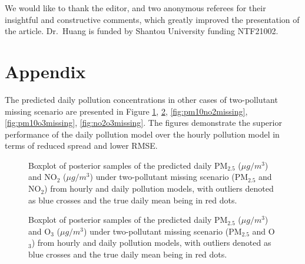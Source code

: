 \documentclass[
  12,
]{article}
\begin{document}
We would like to thank the editor, and two anonymous referees for their
insightful and constructive comments, which greatly improved the
presentation of the article. Dr.~Huang is funded by Shantou University
funding NTF21002.

\hypertarget{appendix}{%
\section*{Appendix}\label{appendix}}

The predicted daily pollution concentrations in other cases of
two-pollutant missing scenario are presented in Figure
\ref{fig:pm25no2missing}, \ref{fig:pm25o3missing},
\ref{fig:pm10no2missing}, \ref{fig:pm10o3missing},
\ref{fig:no2o3missing}. The figures demonstrate the superior performance
of the daily pollution model over the hourly pollution model in terms of
reduced spread and lower RMSE.

\begin{figure}[H]
\caption{Boxplot of posterior samples of the predicted daily PM$_{2.5}$ ($\mu g/m^3$) and NO$_{2}$ ($\mu g/m^3$) under two-pollutant missing scenario (PM$_{2.5}$ and NO$_2$) from hourly and daily pollution models, with outliers denoted as blue crosses and the true daily mean being in red dots.}\label{fig:pm25no2missing}
\end{figure}

\begin{figure}[H]
\caption{Boxplot of posterior samples of the predicted daily PM$_{2.5}$ ($\mu g/m^3$) and O$_{3}$ ($\mu g/m^3$) under two-pollutant missing scenario (PM$_{2.5}$ and O$_3$) from hourly and daily pollution models, with outliers denoted as blue crosses and the true daily mean being in red dots.}\label{fig:pm25o3missing}
\end{figure}
\end{document}
